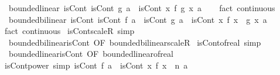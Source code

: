 \begin{isabellebody}
{\isafoldproof}%
%
\isadelimproof
\isanewline
%
\endisadelimproof
\isanewline
{}\isamarkupfalse%
\ {\isacharparenleft}{\kern0pt}\ bounded{\isacharunderscore}{\kern0pt}linear{\isacharparenright}{\kern0pt}\ isCont{\isacharcolon}{\kern0pt}\ {\isachardoublequoteopen}isCont\ g\ a\ {\isasymLongrightarrow}\ isCont\ {\isacharparenleft}{\kern0pt}{\isasymlambda}x{\isachardot}{\kern0pt}\ f\ {\isacharparenleft}{\kern0pt}g\ x{\isacharparenright}{\kern0pt}{\isacharparenright}{\kern0pt}\ a{\isachardoublequoteclose}\isanewline
%
\isadelimproof
\ \ %
\endisadelimproof
%
\isatagproof
{}\isamarkupfalse%
\ {\isacharparenleft}{\kern0pt}fact\ continuous{\isacharparenright}{\kern0pt}%
\endisatagproof
{\isafoldproof}%
%
\isadelimproof
\isanewline
%
\endisadelimproof
\isanewline
{}\isamarkupfalse%
\ {\isacharparenleft}{\kern0pt}\ bounded{\isacharunderscore}{\kern0pt}bilinear{\isacharparenright}{\kern0pt}\ isCont{\isacharcolon}{\kern0pt}\ {\isachardoublequoteopen}isCont\ f\ a\ {\isasymLongrightarrow}\ isCont\ g\ a\ {\isasymLongrightarrow}\ isCont\ {\isacharparenleft}{\kern0pt}{\isasymlambda}x{\isachardot}{\kern0pt}\ f\ x\ {\isacharasterisk}{\kern0pt}{\isacharasterisk}{\kern0pt}\ g\ x{\isacharparenright}{\kern0pt}\ a{\isachardoublequoteclose}\isanewline
%
\isadelimproof
\ \ %
\endisadelimproof
%
\isatagproof
{}\isamarkupfalse%
\ {\isacharparenleft}{\kern0pt}fact\ continuous{\isacharparenright}{\kern0pt}%
\endisatagproof
{\isafoldproof}%
%
\isadelimproof
\isanewline
%
\endisadelimproof
\isanewline
{}\isamarkupfalse%
\ isCont{\isacharunderscore}{\kern0pt}scaleR\ {\isacharbrackleft}{\kern0pt}simp{\isacharbrackright}{\kern0pt}\ {\isacharequal}{\kern0pt}\isanewline
\ \ bounded{\isacharunderscore}{\kern0pt}bilinear{\isachardot}{\kern0pt}isCont\ {\isacharbrackleft}{\kern0pt}OF\ bounded{\isacharunderscore}{\kern0pt}bilinear{\isacharunderscore}{\kern0pt}scaleR{\isacharbrackright}{\kern0pt}\isanewline
\isanewline
{}\isamarkupfalse%
\ isCont{\isacharunderscore}{\kern0pt}of{\isacharunderscore}{\kern0pt}real\ {\isacharbrackleft}{\kern0pt}simp{\isacharbrackright}{\kern0pt}\ {\isacharequal}{\kern0pt}\isanewline
\ \ bounded{\isacharunderscore}{\kern0pt}linear{\isachardot}{\kern0pt}isCont\ {\isacharbrackleft}{\kern0pt}OF\ bounded{\isacharunderscore}{\kern0pt}linear{\isacharunderscore}{\kern0pt}of{\isacharunderscore}{\kern0pt}real{\isacharbrackright}{\kern0pt}\isanewline
\isanewline
{}\isamarkupfalse%
\ isCont{\isacharunderscore}{\kern0pt}power\ {\isacharbrackleft}{\kern0pt}simp{\isacharbrackright}{\kern0pt}{\isacharcolon}{\kern0pt}\ {\isachardoublequoteopen}isCont\ f\ a\ {\isasymLongrightarrow}\ isCont\ {\isacharparenleft}{\kern0pt}{\isasymlambda}x{\isachardot}{\kern0pt}\ f\ x\ {\isacharcircum}{\kern0pt}\ n{\isacharparenright}{\kern0pt}\ a{\isachardoublequoteclose}\isanewline

\end{isabellebody}
